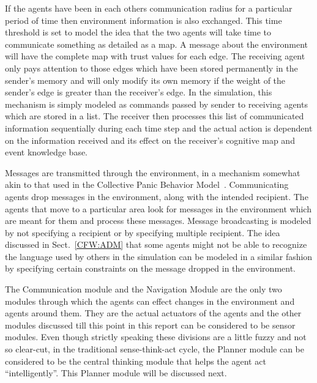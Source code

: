 If the agents have been in each others communication radius for a particular period of time then environment information is also exchanged. This time threshold is set to model the idea that the two agents will take time to communicate something as detailed as a map. A message about the environment will have the complete map with trust values for each edge. The receiving agent only pays attention to those edges which have been stored permanently in the sender's memory and will only modify its own memory if the weight of the sender's edge is greater than the receiver's edge. In the simulation, this mechanism is simply modeled as commands passed by sender to receiving agents which are stored in a list. The receiver then processes this list of communicated information sequentially during each time step and the actual action is dependent on the information received and its effect on the receiver's cognitive map and event knowledge base.

Messages are transmitted through the environment, in a mechanism somewhat akin to that used in the Collective Panic Behavior Model~\cite{Franca:2009wq}. Communicating agents drop messages in the environment, along with the intended recipient. The agents that move to a particular area look for messages in the environment which are meant for them and process these messages. Message broadcasting is modeled by not specifying a recipient or by specifying multiple recipient. The idea discussed in Sect.~\ref{CFW:ADM} that some agents might not be able to recognize the language used by others in the simulation can be modeled in a similar fashion by specifying certain constraints on the message dropped in the environment.

The Communication module and the Navigation Module are the only two modules through which the agents can effect changes in the environment and agents around them. They are the actual actuators of the agents and the other modules discussed till this point in this report can be considered to be sensor modules. Even though strictly speaking these divisions are a little fuzzy and not so clear-cut, in the traditional sense-think-act cycle, the Planner module can be considered to be the central thinking module that helps the agent act ``intelligently''. This Planner module will be discussed next.

